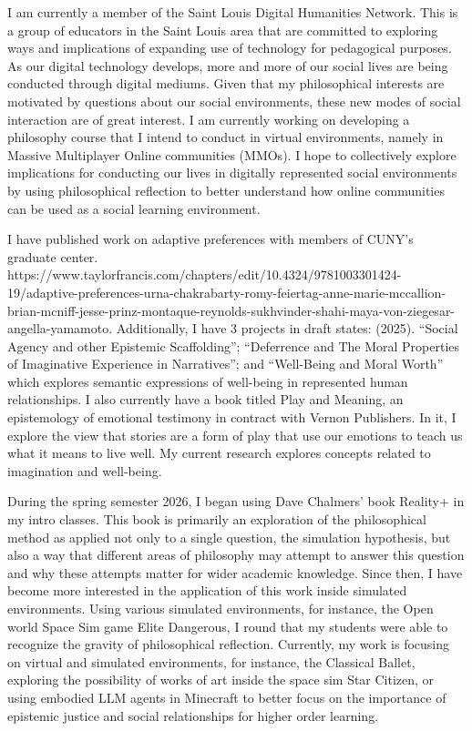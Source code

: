 \documentclass[
  letterpaper,
  DIV=11,
  numbers=noendperiod]{scrartcl}
\begin{document}
I am currently a member of the Saint Louis Digital Humanities Network.
This is a group of educators in the Saint Louis area that are committed
to exploring ways and implications of expanding use of technology for
pedagogical purposes. As our digital technology develops, more and more
of our social lives are being conducted through digital mediums. Given
that my philosophical interests are motivated by questions about our
social environments, these new modes of social interaction are of great
interest. I am currently working on developing a philosophy course that
I intend to conduct in virtual environments, namely in Massive
Multiplayer Online communities (MMOs). I hope to collectively explore
implications for conducting our lives in digitally represented social
environments by using philosophical reflection to better understand how
online communities can be used as a social learning environment.

I have published work on adaptive preferences with members of CUNY's
graduate center.
https://www.taylorfrancis.com/chapters/edit/10.4324/9781003301424-19/adaptive-preferences-urna-chakrabarty-romy-feiertag-anne-marie-mccallion-brian-mcniff-jesse-prinz-montaque-reynolds-sukhvinder-shahi-maya-von-ziegesar-angella-yamamoto.
Additionally, I have 3 projects in draft states: (2025). ``Social Agency
and other Epistemic Scaffolding''; ``Deferrence and The Moral Properties
of Imaginative Experience in Narratives''; and ``Well-Being and Moral
Worth'' which explores semantic expressions of well-being in represented
human relationships. I also currently have a book titled Play and
Meaning, an epistemology of emotional testimony in contract with Vernon
Publishers. In it, I explore the view that stories are a form of play
that use our emotions to teach us what it means to live well. My current
research explores concepts related to imagination and well-being.

During the spring semester 2026, I began using Dave Chalmers' book
Reality+ in my intro classes. This book is primarily an exploration of
the philosophical method as applied not only to a single question, the
simulation hypothesis, but also a way that different areas of philosophy
may attempt to answer this question and why these attempts matter for
wider academic knowledge. Since then, I have become more interested in
the application of this work inside simulated environments. Using
various simulated environments, for instance, the Open world Space Sim
game Elite Dangerous, I round that my students were able to recognize
the gravity of philosophical reflection. Currently, my work is focusing
on virtual and simulated environments, for instance, the Classical
Ballet, exploring the possibility of works of art inside the space sim
Star Citizen, or using embodied LLM agents in Minecraft to better focus
on the importance of epistemic justice and social relationships for
higher order learning.
\end{document}
